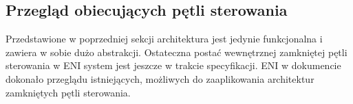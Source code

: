 \subsection{Przegląd obiecujących pętli sterowania}

Przedstawione w poprzedniej sekcji architektura jest jedynie funkcjonalna i zawiera w sobie dużo abstrakcji. Ostateczna postać wewnętrznej zamkniętej pętli sterowania w ENI system jest jeszcze w trakcie specyfikacji. ENI w dokumencie \cite{enioverview} dokonało przeglądu istniejących, możliwych do zaaplikowania architektur zamkniętych pętli sterowania. 